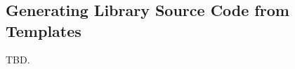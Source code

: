 \chapter[\cbpczerotitleemph{}]{\cbpczerolongtitleemph{}}
\chaptermark{\cbpczeroshorttitlenoemph{}}
\label{cbpc0}


\section{Generating Library Source Code from Templates}
\label{cbpc0:sgsc0}

TBD.



